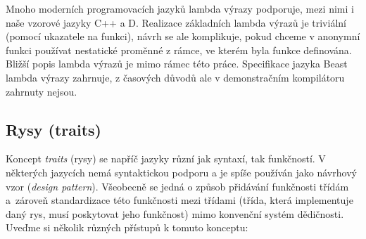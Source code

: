 Mnoho moderních programovacích jazyků lambda výrazy podporuje, mezi nimi i naše vzorové jazyky C++ a D. Realizace základních lambda výrazů je triviální (pomocí ukazatele na funkci), návrh se ale komplikuje, pokud chceme v anonymní funkci používat nestatické proměnné z rámce, ve kterém byla funkce definována. Bližší popis lambda výrazů je mimo rámec této práce. Specifikace jazyka Beast lambda výrazy zahrnuje, z časových důvodů ale v demonstračním kompilátoru zahrnuty nejsou.

\subsection{Rysy (traits)}
Koncept \textit{traits} (rysy) se napříč jazyky různí jak syntaxí, tak funkčností. V některých jazycích nemá syntaktickou podporu a je spíše používán jako návrhový vzor (\textit{design pattern}). Všeobecně se jedná o způsob přidávání funkčnosti třídám a~zároveň standardizace této funkčnosti mezi třídami (třída, která implementuje daný rys, musí poskytovat jeho funkčnost) mimo konvenční systém dědičnosti. Uveďme si několik různých přístupů k tomuto konceptu:

